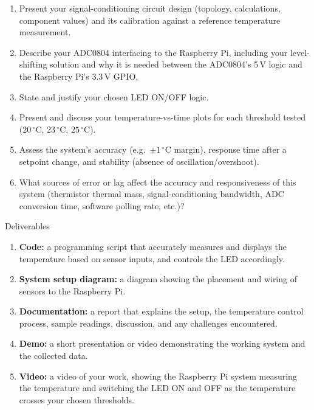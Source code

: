 \begin{reportq}
  \begin{enumerate}
    \item Present your signal-conditioning circuit design (topology, calculations, component values) and its calibration against a reference temperature measurement.
    \item Describe your ADC0804 interfacing to the Raspberry Pi, including your level-shifting solution and why it is needed between the ADC0804's 5\,V logic and the Raspberry Pi's 3.3\,V GPIO.
    \item State and justify your chosen LED ON/OFF logic.
    \item Present and discuss your temperature-vs-time plots for each threshold tested ($20\,^{\circ}\text{C}$, $23\,^{\circ}\text{C}$, $25\,^{\circ}\text{C}$).
    \item Assess the system's accuracy (e.g.\ $\pm 1\,^{\circ}\text{C}$ margin), response time after a setpoint change, and stability (absence of oscillation/overshoot).
    \item What sources of error or lag affect the accuracy and responsiveness of this system (thermistor thermal mass, signal-conditioning bandwidth, ADC conversion time, software polling rate, etc.)?
  \end{enumerate}
\end{reportq}

\begin{labsection}{Deliverables}{}
  \begin{enumerate}
    \item \textbf{Code:} a programming script that accurately measures and displays the temperature based on sensor inputs, and controls the LED accordingly.
    \item \textbf{System setup diagram:} a diagram showing the placement and wiring of sensors to the Raspberry Pi.
    \item \textbf{Documentation:} a report that explains the setup, the temperature control process, sample readings, discussion, and any challenges encountered.
    \item \textbf{Demo:} a short presentation or video demonstrating the working system and the collected data.
    \item \textbf{Video:} a video of your work, showing the Raspberry Pi system measuring the temperature and switching the LED ON and OFF as the temperature crosses your chosen thresholds.
  \end{enumerate}
\end{labsection}

